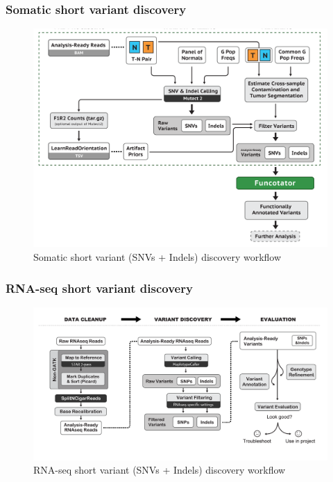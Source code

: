 \documentclass{beamer}
\begin{document}
    \begin{frame}
        \frametitle{Somatic short variant discovery}

        \begin{figure}
            \includegraphics[width=0.7 \linewidth]{figures/Workflow/somatic_short_variants.png}
            \caption{Somatic short variant (SNVs + Indels) discovery workflow \protect\cite{gatk1, gatk2}}
        \end{figure}
    \end{frame}

    \begin{frame}
        \frametitle{RNA-seq short variant discovery}

        \begin{figure}
            \includegraphics[width=0.8 \linewidth]{figures/Workflow/RNA_short_variant.png}
            \caption{RNA-seq short variant (SNVs + Indels) discovery workflow \protect\cite{gatk1, gatk2}}
        \end{figure}
    \end{frame}
\end{document}
